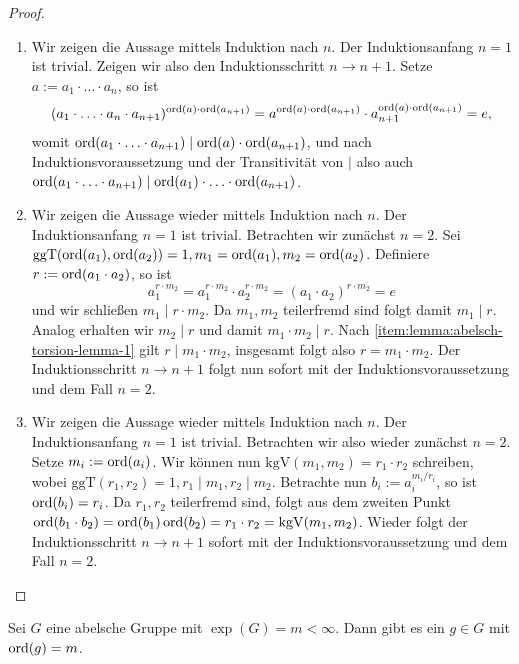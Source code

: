 \begin{proof}{\ }
    \begin{enumerate}
        \item Wir zeigen die Aussage mittels Induktion nach $n$. Der Induktionsanfang $n=1$ ist trivial. Zeigen wir also den Induktionsschritt $n \to n + 1$. Setze $a := a_1 \cdot \hdots \cdot a_n$, so ist
        $$ (a_1 \cdot \hdots \cdot a_n \cdot a_{n+1})^{\operatorname{ord}(a) \cdot \operatorname{ord}(a_{n+1})} = a^{\operatorname{ord}(a) \cdot \operatorname{ord}(a_{n+1})} \cdot a_{n+1}^{\operatorname{ord}(a) \cdot \operatorname{ord}(a_{n+1})} = e, $$
        womit $\operatorname{ord}(a_1 \cdot \hdots \cdot a_{n+1}) \mid \operatorname{ord}(a) \cdot \operatorname{ord}(a_{n+1})$, und nach Induktionsvoraussetzung und der Transitivität von $\mid$ also auch $\operatorname{ord}(a_1 \cdot \hdots \cdot a_{n+1}) \mid \operatorname{ord}(a_1) \cdot \hdots \cdot \operatorname{ord}(a_{n+1})$.

        \item Wir zeigen die Aussage wieder mittels Induktion nach $n$. Der Induktionsanfang $n=1$ ist trivial. Betrachten wir zunächst $n=2$. Sei $\mathrm{ggT}(\operatorname{ord}(a_1), \operatorname{ord}(a_2)) = 1, m_1 = \operatorname{ord}(a_1), m_2 = \operatorname{ord}(a_2)$. Definiere $r := \operatorname{ord}(a_1 \cdot a_2)$, so ist
        $$ a_1^{r \cdot m_2} = a_1^{r \cdot m_2} \cdot a_2^{r \cdot m_2} = (a_1 \cdot a_2)^{r \cdot m_2} = e $$
        und wir schließen $m_1 \mid r \cdot m_2$. Da $m_1, m_2$ teilerfremd sind folgt damit $m_1 \mid r$. Analog erhalten wir $m_2 \mid r$ und damit $m_1 \cdot m_2 \mid r$. Nach \ref*{item:lemma:abelsch-torsion-lemma-1} gilt $r \mid m_1 \cdot m_2$, insgesamt folgt also $r = m_1 \cdot m_2$. Der Induktionsschritt $n \to n+1$ folgt nun sofort mit der Induktionsvoraussetzung und dem Fall $n=2$.

        \item Wir zeigen die Aussage wieder mittels Induktion nach $n$. Der Induktionsanfang $n=1$ ist trivial. Betrachten wir also wieder zunächst $n=2$. Setze $m_i := \operatorname{ord}(a_i)$. Wir können nun $\mathrm{kgV}(m_1, m_2) = r_1 \cdot r_2$ schreiben, wobei $\mathrm{ggT}(r_1, r_2) = 1, r_1 \mid m_1, r_2 \mid m_2$. Betrachte nun $b_i := a_i^{m_i / r_i}$, so ist $\operatorname{ord}(b_i) = r_i$. Da $r_1, r_2$ teilerfremd sind, folgt aus dem zweiten Punkt $\operatorname{ord}(b_1 \cdot b_2) = \operatorname{ord}(b_1) \operatorname{ord}(b_2) = r_1 \cdot r_2 = \mathrm{kgV}(m_1, m_2)$. Wieder folgt der Induktionsschritt $n \to n+1$ sofort mit der Induktionsvoraussetzung und dem Fall $n=2$. 
    \end{enumerate}
\end{proof}

\begin{corollary} \label{corollary:exponent_exist}
    Sei $G$ eine abelsche Gruppe mit $\exp(G) = m < \infty$. Dann gibt es ein $g \in G$ mit $\operatorname{ord}(g) = m$.
\end{corollary}

